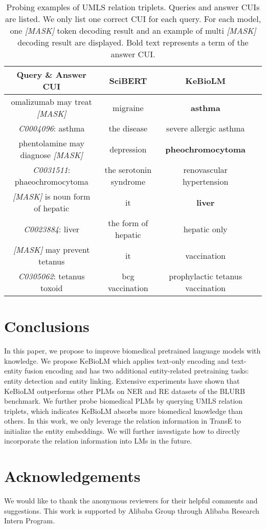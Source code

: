 \documentclass[11pt]{article}
\begin{document}
\begin{table*}[ht]
\centering
\begin{tabular}{c|ccc}
\hline
Query \& Answer CUI&SciBERT&KeBioLM\\
\hline
omalizumab may treat \textit{[MASK]}&migraine&\textbf{asthma}\\
\textit{C0004096}: asthma&the disease&severe allergic asthma\\
\hline
phentolamine may diagnose \textit{[MASK]} &depression&\textbf{pheochromocytoma}\\
\textit{C0031511}: phaeochromocytoma&the serotonin syndrome&renovascular hypertension\\
\hline
\textit{[MASK]} is noun form of hepatic&it&\textbf{liver}\\
\textit{C0023884}: liver&the form of hepatic&hepatic only\\
\hline
\textit{[MASK]} may prevent tetanus&it&vaccination\\
\textit{C0305062}: tetanus toxoid&bcg vaccination&prophylactic tetanus vaccination\\
\hline
\end{tabular}
\caption{Probing examples of UMLS relation triplets. Queries and answer CUIs are listed. We only list one correct CUI for each query. For each model, one \textit{[MASK]} token decoding result and an example of multi \textit{[MASK]} decoding result are displayed. Bold text represents a term of the answer CUI.}
\label{tab:probe_example}
\end{table*}





\section{Conclusions}
In this paper, we propose to improve biomedical pretrained language models with knowledge.
We propose KeBioLM which applies text-only encoding and text-entity fusion encoding and
has two additional entity-related pretraining tasks: entity detection and entity linking.
Extensive experiments have shown that KeBioLM outperforms other PLMs on NER and RE datasets of the BLURB benchmark.
We further probe biomedical PLMs by querying UMLS relation triplets, which indicates KeBioLM absorbs more biomedical knowledge than others.
In this work, we only leverage the relation information in TransE to initialize the entity embeddings. We will further investigate how to directly incorporate the relation information into LMs in the future.

\section*{Acknowledgements}
We would like to thank the anonymous reviewers for their helpful comments and suggestions.
This work is supported by Alibaba Group through Alibaba Research Intern Program.




\end{document}
